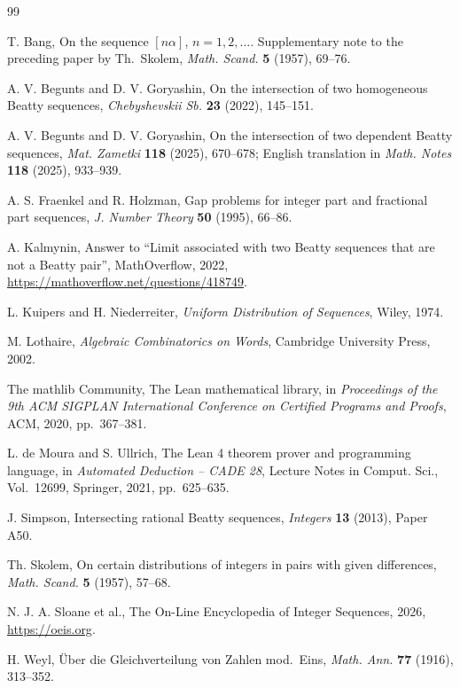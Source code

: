 \documentclass[12pt]{article}
\theoremstyle{plain}
\theoremstyle{remark}
\begin{document}
\begin{thebibliography}{99}

T. Bang, On the sequence $[n\alpha]$, $n=1,2,\dots$. Supplementary note to the preceding paper
by Th.~Skolem, \emph{Math. Scand.} \textbf{5} (1957), 69--76.

A. V. Begunts and D. V. Goryashin, On the intersection of two homogeneous Beatty sequences,
\emph{Chebyshevskii Sb.} \textbf{23} (2022), 145--151.

A. V. Begunts and D. V. Goryashin, On the intersection of two dependent Beatty sequences,
\emph{Mat. Zametki} \textbf{118} (2025), 670--678; English translation in
\emph{Math. Notes} \textbf{118} (2025), 933--939.

A. S. Fraenkel and R. Holzman, Gap problems for integer part and fractional part sequences,
\emph{J. Number Theory} \textbf{50} (1995), 66--86.

A. Kalmynin, Answer to ``Limit associated with two Beatty sequences that are not a Beatty
pair'', MathOverflow, 2022, \url{https://mathoverflow.net/questions/418749}.

L. Kuipers and H. Niederreiter, \emph{Uniform Distribution of Sequences}, Wiley, 1974.

M. Lothaire, \emph{Algebraic Combinatorics on Words}, Cambridge University Press, 2002.

The mathlib Community, The Lean mathematical library, in \emph{Proceedings of the 9th ACM
SIGPLAN International Conference on Certified Programs and Proofs}, ACM, 2020, pp.~367--381.

L. de Moura and S. Ullrich, The Lean 4 theorem prover and programming language, in
\emph{Automated Deduction -- CADE 28}, Lecture Notes in Comput. Sci., Vol.~12699, Springer,
2021, pp.~625--635.

J. Simpson, Intersecting rational Beatty sequences, \emph{Integers} \textbf{13} (2013),
Paper A50.

Th. Skolem, On certain distributions of integers in pairs with given differences,
\emph{Math. Scand.} \textbf{5} (1957), 57--68.

N. J. A. Sloane et al., The On-Line Encyclopedia of Integer Sequences, 2026,
\url{https://oeis.org}.

H. Weyl, \"Uber die Gleichverteilung von Zahlen mod.\ Eins, \emph{Math. Ann.} \textbf{77}
(1916), 313--352.

\end{thebibliography}
\end{document}
